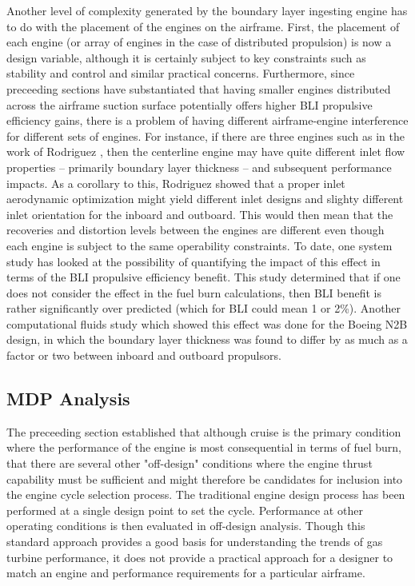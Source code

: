 \indent Another level of complexity generated by the boundary layer ingesting engine has to do with the placement of the engines on the airframe.  First, the placement of each engine (or array of engines in the case of distributed propulsion) is now a design variable, although it is certainly subject to key constraints such as stability and control and similar practical concerns.  Furthermore, since preceeding sections have substantiated that having smaller engines distributed across the airframe suction surface potentially offers higher BLI propulsive efficiency gains, there is a problem of having different airframe-engine interference for different sets of engines.  For instance, if there are three engines such as in the work of Rodriguez \cite{RodriguezThesis}, then the centerline engine may have quite different inlet flow properties -- primarily boundary layer thickness -- and subsequent performance impacts.  As a corollary to this, Rodriguez showed that a proper inlet aerodynamic optimization might yield different inlet designs and slighty different inlet orientation for the inboard and outboard.  This would then mean that the recoveries and distortion levels between the engines are different even though each engine is subject to the same operability constraints.  To date, one system study has looked at the possibility of quantifying the impact of this \cite{Sato2011} effect in terms of the BLI propulsive efficiency benefit.  This study determined that if one does not consider the effect in the fuel burn calculations, then BLI benefit is rather significantly over predicted (which for BLI could mean 1 or 2\%).  Another computational fluids study \cite{Kim2012} which showed this effect was done for the Boeing N2B design, in which the boundary layer thickness was found to differ by as much as a factor or two between inboard and outboard propulsors. 
\subsection{MDP Analysis}

\indent The preceeding section established that although cruise is the primary condition where the performance of the engine is most consequential in terms of fuel burn, that there are several other "off-design" conditions where the engine thrust capability must be sufficient and might therefore be candidates for inclusion into the engine cycle selection process.  The traditional engine design process has been performed at a single design point to set the cycle.  Performance at other operating conditions is then evaluated in off-design analysis.  Though this standard approach provides a good basis for understanding the trends of gas turbine performance, it does not provide a practical approach for a designer to match an engine and performance requirements for a particular airframe.  

